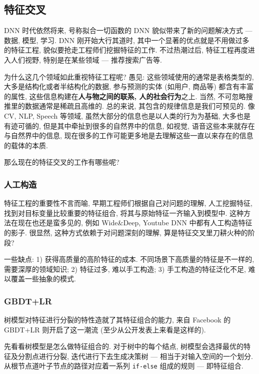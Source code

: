 \subsection{特征交叉}
DNN 时代依然将来, 号称拟合一切函数的 DNN 貌似带来了新的问题解决方式 --- 数据, 模型, 学习. DNN 刚开始大行其道时, 其中一个显著的优点就是不用做过多的特征工程, 貌似要抢走工程师们挖掘特征的工作. 不过热潮过后, 特征工程再度进入人们视野, 特别是在某些领域 --- 推荐搜索广告等. 

为什么这几个领域如此重视特征工程呢? 愚见: 这些领域使用的通常是表格类型的, 大多是结构化或者半结构化的数据, 参与预测的实体 (如用户, 商品等) 都含有丰富的属性, 这些信息构建在\textbf{人与物之间的联系, 人的社会行为}之上. 当然, 不可忽略搜推里的数据通常是稀疏且高维的. 总的来说, 其包含的规律信息是我们可预见的. 像 CV,  NLP, Speech 等领域, 虽然大部分的信息也是以人类的行为为基础, 大多也是有迹可循的, 但是其中牵扯到很多的自然界中的信息, 如视觉, 语音这些本来就存在与自然界中的信息, 现在很多的工作可能更多地是去理解这些一直以来存在的信息的载体的本质. 

那么现在的特征交叉的工作有哪些呢?

\subsubsection{人工构造}

特征工程的重要性不言而喻, 早期工程师们根据自己对问题的理解, 人工挖掘特征, 找到对目标变量比较重要的特征组合, 将其与原始特征一齐输入到模型中. 这种方法在现在也还是蛮多见的, 例如 Wide\&Deep, Youtube DNN 中都有人工构造特征的影子. 很显然, 这种方式依赖于对问题深刻的理解, 算是特征交叉里刀耕火种的阶段?

一些缺点: 1) 获得高质量的高阶特征的成本. 不同场景下高质量的特征是不一样的, 需要深厚的领域知识; 2) 特征过多, 难以手工构造; 3) 手工构造的特征泛化不足, 难以覆盖一些抽象的模式.

\subsubsection{GBDT+LR}

树模型对特征进行分裂的特性造就了其特征组合的能力, 来自 Facebook 的 GBDT+LR\cite{he_gbdtlr_2014} 则开启了这一潮流 (至少从公开发表上来看是这样的). 

先看看树模型是怎么做特征组合的. 对于树中的每个结点, 树模型会选择最优的特征及分割点进行分裂, 迭代进行下去生成决策树 --- 相当于对输入空间的一个划分. 从根节点道叶子节点的路径对应着一系列 \texttt{if-else} 组成的规则 --- 即特征组合. 

